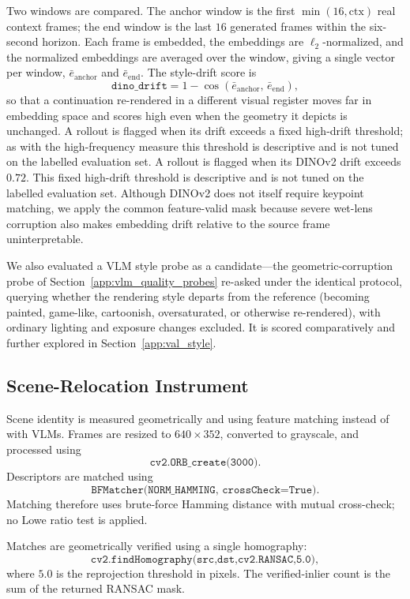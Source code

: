 Two windows are compared. The anchor window is the first $\min(16,\text{ctx})$
real context frames; the end window is the last $16$ generated frames within the
six-second horizon. Each frame is embedded, the embeddings are
$\ell_2$-normalized, and the normalized embeddings are averaged over the window,
giving a single vector per window, $\bar e_{\mathrm{anchor}}$ and
$\bar e_{\mathrm{end}}$. The style-drift score is
\[
\texttt{dino\_drift}
=
1-\cos\!\left(\bar e_{\mathrm{anchor}},\,\bar e_{\mathrm{end}}\right),
\]
so that a continuation re-rendered in a different visual register moves far in
embedding space and scores high even when the geometry it depicts is unchanged.
A rollout is flagged when its drift exceeds a fixed high-drift threshold; as with
the high-frequency measure this threshold is descriptive and is not tuned on the
labelled evaluation set. A rollout is flagged when its DINOv2 drift exceeds $0.72$. This fixed
high-drift threshold is descriptive and is not tuned on the labelled
evaluation set. Although DINOv2 does not itself require keypoint matching, we
apply the common feature-valid mask because severe wet-lens corruption also
makes embedding drift relative to the source frame uninterpretable.

We also evaluated a VLM style probe as a candidate---the geometric-corruption
probe of Section~\ref{app:vlm_quality_probes} re-asked under the identical
protocol, querying whether the rendering style departs from the reference
(becoming painted, game-like, cartoonish, oversaturated, or otherwise
re-rendered), with ordinary lighting and exposure changes excluded. It is scored
comparatively and further explored in Section~\ref{app:val_style}.

\subsection{Scene-Relocation Instrument}
\label{app:scene_relocation}

Scene identity is measured geometrically and using feature matching instead of with VLMs. Frames are
resized to $640\times352$, converted to grayscale, and processed using
\[
\texttt{cv2.ORB\_create(3000)}.
\]
Descriptors are matched using
\[
\texttt{BFMatcher(NORM\_HAMMING, crossCheck=True)}.
\]
Matching therefore uses brute-force Hamming distance with mutual cross-check;
no Lowe ratio test is applied.

Matches are geometrically verified using a single homography:
\[
\texttt{cv2.findHomography(src,dst,cv2.RANSAC,5.0)},
\]
where $5.0$ is the reprojection threshold in pixels. The verified-inlier
count is the sum of the returned RANSAC mask.

